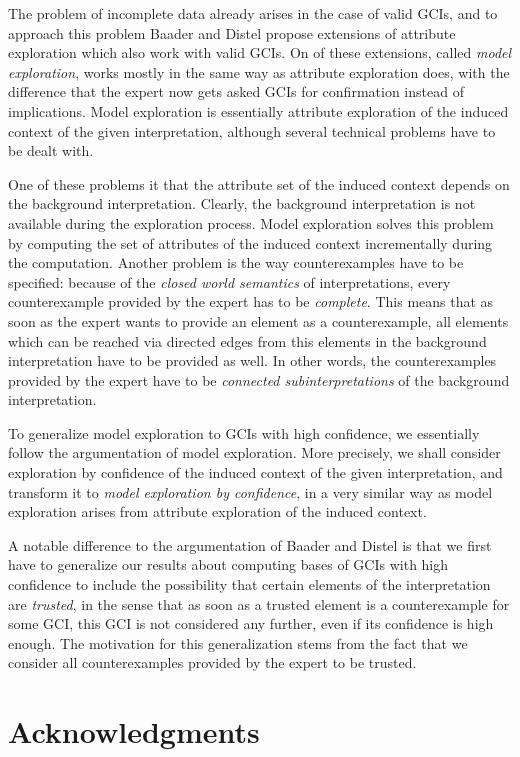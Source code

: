The problem of incomplete data already arises in the case of valid GCIs, and to approach
this problem Baader and Distel propose extensions of attribute exploration which also work
with valid GCIs.  On of these extensions, called \emph{model exploration}, works mostly in
the same way as attribute exploration does, with the difference that the expert now gets
asked GCIs for confirmation instead of implications.  Model exploration is essentially
attribute exploration of the induced context of the given interpretation, although several
technical problems have to be dealt with.

One of these problems it that the attribute set of the induced context depends on the
background interpretation.  Clearly, the background interpretation is not available during
the exploration process.  Model exploration solves this problem by computing the set of
attributes of the induced context incrementally during the computation.  Another problem
is the way counterexamples have to be specified: because of the \emph{closed world
  semantics} of interpretations, every counterexample provided by the expert has to be
\emph{complete}.  This means that as soon as the expert wants to provide an element as a
counterexample, all elements which can be reached via directed edges from this elements in
the background interpretation have to be provided as well.  In other words, the
counterexamples provided by the expert have to be \emph{connected subinterpretations} of
the background interpretation.

To generalize model exploration to GCIs with high confidence, we essentially follow the
argumentation of model exploration.  More precisely, we shall consider exploration by
confidence of the induced context of the given interpretation, and transform it to
\emph{model exploration by confidence}, in a very similar way as model exploration arises
from attribute exploration of the induced context.

A notable difference to the argumentation of Baader and Distel is that we first have to
generalize our results about computing bases of GCIs with high confidence to include the
possibility that certain elements of the interpretation are \emph{trusted}, in the sense
that as soon as a trusted element is a counterexample for some GCI, this GCI is not
considered any further, even if its confidence is high enough.  The motivation for this
generalization stems from the fact that we consider all counterexamples provided by the
expert to be trusted.

\section*{Acknowledgments}
\label{sec:acknowledgements}



